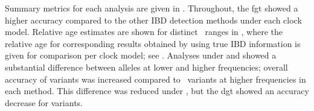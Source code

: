 Summary metrics for each analysis are given in .
Throughout, the \gls{fgt} showed a higher accuracy compared to the other IBD detection methods under each clock model.
Relative age estimates are shown for distinct \fk{}~ranges in , where the relative age for corresponding results obtained by using true IBD information is given for comparison per clock model; see .
Analyses under \ClockM and \ClockC showed a substantial difference between alleles at lower and higher frequencies; \eg overall accuracy of \fk{[2,5]} variants was increased compared to \fk{}~variants at higher frequencies in each method.
This difference was reduced under \ClockR, but the \gls{dgt} showed an accuracy decrease for \fk{[2,5]} variants.

%

%


% 
%



